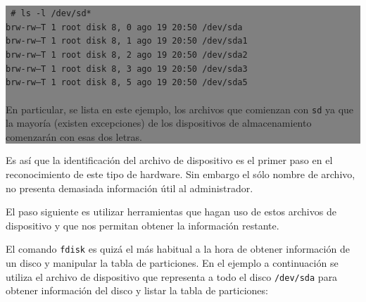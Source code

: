 \documentclass[12pt]{article}
\begin{document}
\colorbox{grey}{\parbox[t]{0.95\linewidth}{ \vspace*{0.5cm} { 
{\tt
\# ls -l /dev/sd*\\
brw-rw---T  1 root disk        8,   0 ago 19 20:50 /dev/sda\\
brw-rw---T  1 root disk        8,   1 ago 19 20:50 /dev/sda1\\
brw-rw---T  1 root disk        8,   2 ago 19 20:50 /dev/sda2\\
brw-rw---T  1 root disk        8,   3 ago 19 20:50 /dev/sda3\\
brw-rw---T  1 root disk        8,   5 ago 19 20:50 /dev/sda5\\
}
\\
En particular, se lista en este ejemplo, los archivos que comienzan con \texttt{sd} ya que la 
mayoría (existen excepciones) de los dispositivos de almacenamiento comenzarán con esas 
dos letras. 
} \vspace*{0.5cm} } } 

Es así que la identificación del archivo de dispositivo es el primer paso en el 
reconocimiento de este tipo de hardware. Sin embargo el sólo nombre de archivo, no 
presenta demasiada información útil al administrador.


El paso 
siguiente es utilizar herramientas que hagan uso de estos archivos de dispositivo y que nos 
permitan obtener la información restante.

El comando \texttt{fdisk} es quizá el más habitual a la hora de obtener 
información de un disco y manipular la tabla de particiones. En el ejemplo
a continuación se utiliza el archivo de dispositivo que representa a todo 
el disco \texttt{/dev/sda} para obtener información del disco y listar la tabla de particiones:
 
\end{document}
